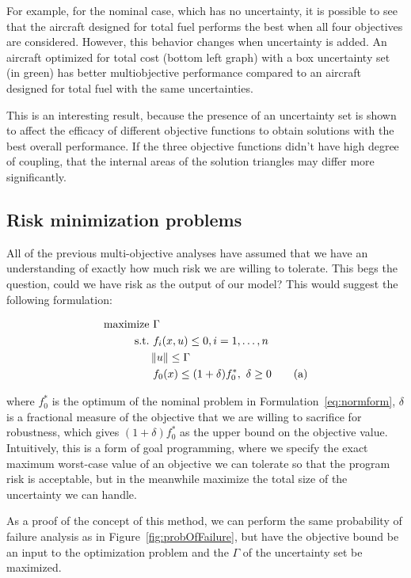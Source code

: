 For example, for the nominal case, which has no uncertainty, it is possible to see that
the aircraft designed for total fuel performs the best when all four objectives are considered.
However, this behavior changes when uncertainty is added. An aircraft optimized for total cost
(bottom left graph) with a box uncertainty set (in green) has better multiobjective performance
compared to an aircraft designed for total fuel with the same uncertainties.

This is an interesting result, because the presence of an uncertainty set is
shown to affect the efficacy of different objective functions to obtain solutions
with the best overall performance. If the three objective functions didn't
have high degree of coupling, that the internal areas of the solution triangles may differ
more significantly.

\subsection{Risk minimization problems}

All of the previous multi-objective analyses have assumed that we have an
understanding of exactly how much risk we are
willing to tolerate. This begs the question, could we have risk as the output of our
model? This would suggest the following formulation:

\begin{align*}
    \text{maximize} &~\Gamma \\
    \text{s.t.}     &~f_i(x,u) \leq 0, i = 1,\ldots,n \\
                    & \left\lVert u\right\rVert \leq \Gamma \\
                    &~f_0(x) \leq (1+\delta)f_0^*,~\delta \geq 0 \tag{a}
    \label{eq:goalprogramming}
\end{align*}

where $f_0^*$ is the optimum of the nominal problem in Formulation~\ref{eq:normform}, $\delta$
is a fractional measure of the objective that we are willing to sacrifice for robustness, which
gives $(1+\delta)f_0^*$ as the upper bound on the objective value. Intuitively,
this is a form of goal programming,
where we specify the exact maximum worst-case value of an objective we can tolerate so that the program
risk is acceptable, but in the meanwhile maximize the total size of the uncertainty we can handle.

As a proof of the concept of this method, we can perform the same probability of failure
analysis as in Figure~\ref{fig:probOfFailure}, but have the objective bound be an input to the
optimization problem and the $\Gamma$ of the uncertainty set be maximized.

